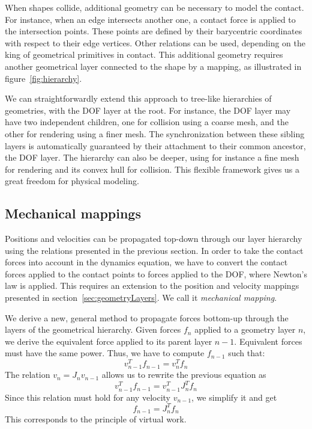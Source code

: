 When shapes collide, additional geometry can be necessary to model the contact.
For instance, when an edge intersects another one, a contact force is applied to the intersection points.
These points are defined by their barycentric coordinates with respect to their edge vertices. Other relations can be used, depending on the king of geometrical primitives in contact.
This additional geometry requires another geometrical layer connected to the shape by a mapping, as illustrated in figure~\ref{fig:hierarchy}.

We can straightforwardly extend this approach to tree-like hierarchies of geometries, with the DOF layer at the root. 
For instance, the DOF layer may have two independent children, one for collision using a coarse mesh, and the other for rendering using a finer mesh. The synchronization between these sibling layers is automatically guaranteed by their attachment to their common ancestor, the DOF layer.
The hierarchy can also be deeper, using for instance a fine mesh for rendering and its convex hull for collision.
This flexible framework gives us a great freedom for physical modeling.

\subsection{Mechanical mappings}
Positions and velocities can be propagated top-down through our layer hierarchy using the relations presented in the previous section.
In order to take the contact forces into account in the dynamics equation, we have to convert the contact forces applied to the contact points to forces applied to the DOF, where Newton's law is applied. 
This requires an extension to the position and velocity mappings presented in section~\ref{sec:geometryLayers}. We call it \textit{mechanical mapping}.

We derive a new, general method to propagate forces bottom-up through the layers of the geometrical hierarchy.
Given forces $f_n$ applied to a geometry layer $n$, we derive the equivalent force applied to its parent layer $n-1$. 
Equivalent forces must have the same power. Thus, we have to compute $f_{n-1}$ such that:
$$
v_{n-1}^T f_{n-1} = v_n^T f_n
$$
The relation $v_{n} = J_{n}v_{n-1}$ allows us to rewrite the previous equation as
$$
v_{n-1}^T f_{n-1} = v_{n-1}^T J_{n}^T f_n
$$
Since this relation must hold for any velocity $v_{n-1}$, we simplify it and get
\begin{equation} \label{eq:mapF}
f_{n-1} = J_n^T f_n
\end{equation}
This corresponds to the principle of virtual work.

